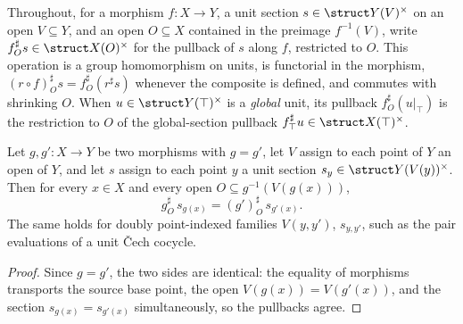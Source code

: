Throughout, for a morphism \(f \colon X \to Y\), a unit section \(s \in \struct Y(V)^{\times}\)
on an open \(V \subseteq Y\), and an open \(O \subseteq X\) contained in the preimage
\(f^{-1}(V)\), write \(f^{\sharp}_O s \in \struct X(O)^{\times}\) for the pullback of \(s\)
along \(f\), restricted to \(O\). This operation is a group homomorphism on units, is
functorial in the morphism, \((r \circ f)^{\sharp}_O s = f^{\sharp}_O (r^{\sharp} s)\) whenever
the composite is defined, and commutes with shrinking \(O\). When \(u \in \struct Y(\top)^{\times}\)
is a \emph{global} unit, its pullback \(f^{\sharp}_O(u|_\top)\) is the restriction to \(O\) of
the global-section pullback \(f^{\sharp}_\top u \in \struct X(\top)^{\times}\).

\begin{lemma}
  \label{pa-lem:unitsAppLE_congr_hom}
  \leanok

  Let \(g, g' \colon X \to Y\) be two morphisms with \(g = g'\), let \(V\) assign to each point
  of \(Y\) an open of \(Y\), and let \(s\) assign to each point \(y\) a unit section
  \(s_y \in \struct Y(V(y))^{\times}\). Then for every \(x \in X\) and every open
  \(O \subseteq g^{-1}(V(g(x)))\),
  \[
    g^{\sharp}_O\, s_{g(x)} = (g')^{\sharp}_O\, s_{g'(x)} .
  \]
  The same holds for doubly point-indexed families \(V(y,y')\), \(s_{y,y'}\), such as the
  pair evaluations of a unit \v Cech cocycle.
\end{lemma}
\begin{proof}
  \leanok
  Since \(g = g'\), the two sides are identical: the equality of morphisms transports the
  source base point, the open \(V(g(x)) = V(g'(x))\), and the section
  \(s_{g(x)} = s_{g'(x)}\) simultaneously, so the pullbacks agree.
\end{proof}

